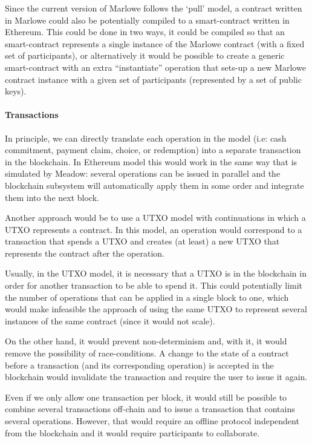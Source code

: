 \documentclass[runningheads]{llncs}
\begin{document}
Since the current version of Marlowe follows the `pull' model, a contract written in Marlowe could also be potentially
compiled to a smart-contract written in Ethereum. This could be done in two ways, it could be compiled so that an 
smart-contract represents a single instance of the Marlowe contract (with a fixed set of participants), or 
alternatively it would be possible to create a generic smart-contract with an extra ``instantiate'' operation that 
sets-up a new Marlowe contract instance with a given set of participants (represented by a set of public keys).

\paragraph{Transactions}

In principle, we can directly translate each operation in the model (i.e: cash commitment, payment claim, choice, or
redemption) into a separate transaction in the blockchain. In Ethereum model this would work in the same 
way that is simulated by Meadow: several operations can be issued in parallel and the blockchain subsystem will 
automatically apply them in some order and integrate them into the next block.

Another approach would be to use a UTXO model with continuations in which a UTXO represents a contract. In this model,
an operation would correspond to a transaction that spends a UTXO and creates (at least) a new UTXO that represents the 
contract after the operation.

Usually, in the UTXO model, it is necessary that a UTXO is in the blockchain in order for another transaction to be able 
to spend it. This could potentially limit the number of operations that can be applied in a single block to one, which 
would make infeasible the approach of using the same UTXO to represent several instances of the same contract (since it 
would not scale).

On the other hand, it would prevent non-determinism and, with it, it would remove the possibility of race-conditions. A 
change to the state of a contract before a transaction (and its corresponding operation) is accepted in the blockchain 
would invalidate the transaction and require the user to issue it again.

Even if we only allow one transaction per block, it would still be possible to combine several transactions off-chain 
and to issue a transaction that contains several operations. However, that would require an offline protocol 
independent from the blockchain and it would require participants to collaborate.
\end{document}
